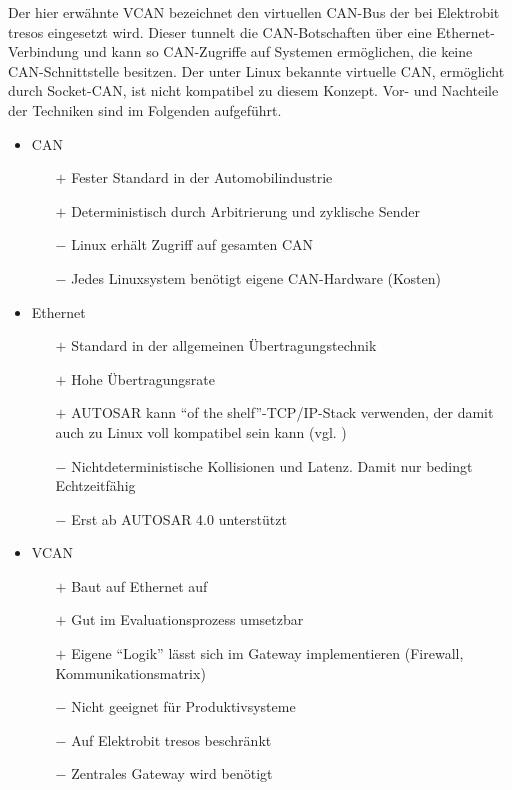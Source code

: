 \documentclass[
  a4paper,					    %
  twoside,
  DIV=calc,     				%
  bibliography=totoc,
  cleardoublepage=empty,
  ngerman,     					%
  final       					%
]{scrbook}
\begin{document}
Der hier erwähnte VCAN bezeichnet den virtuellen CAN-Bus der bei Elektrobit tresos eingesetzt wird. Dieser tunnelt die CAN-Botschaften über eine Ethernet-Verbindung und kann so CAN-Zugriffe auf Systemen ermöglichen, die keine CAN-Schnittstelle besitzen. Der unter Linux bekannte virtuelle CAN, ermöglicht durch Socket-CAN, ist nicht kompatibel zu diesem Konzept. Vor- und Nachteile der Techniken sind im Folgenden aufgeführt.

\begin{itemize}
    \item CAN
    \begin{itemize}
        \item[$+$] Fester Standard in der Automobilindustrie
        \item[$+$] Deterministisch durch Arbitrierung und zyklische Sender
        \item[$-$] Linux erhält Zugriff auf gesamten CAN
        \item[$-$] Jedes Linuxsystem benötigt eigene CAN-Hardware (Kosten)
    \end{itemize}
    \item Ethernet
    \begin{itemize}
        \item[$+$] Standard in der allgemeinen Übertragungstechnik
        \item[$+$] Hohe Übertragungsrate
        \item[$+$] AUTOSAR kann "`of the shelf"'-TCP/IP-Stack verwenden, der damit auch zu Linux voll kompatibel sein kann (vgl. \cite[S. 21]{autosar_eth})
        \item[$-$] Nichtdeterministische Kollisionen und Latenz. Damit nur bedingt Echtzeitfähig
        \item[$-$] Erst ab AUTOSAR 4.0 unterstützt
    \end{itemize}
    \item VCAN
    \begin{itemize}
        \item[$+$] Baut auf Ethernet auf
        \item[$+$] Gut im Evaluationsprozess umsetzbar
        \item[$+$] Eigene "`Logik"' lässt sich im Gateway implementieren (Firewall, Kommunikationsmatrix)
        \item[$-$] Nicht geeignet für Produktivsysteme
        \item[$-$] Auf Elektrobit tresos beschränkt
        \item[$-$] Zentrales Gateway wird benötigt
    \end{itemize}
\end{itemize}
\end{document}

